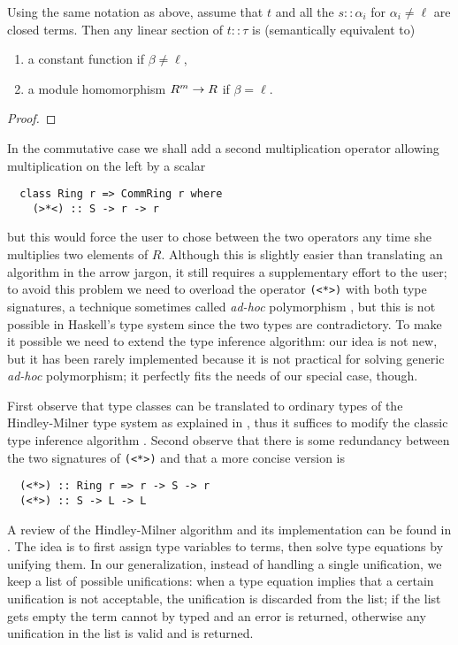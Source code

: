 \begin{proposition}
  \label{th:lininference}
  Using the same notation as above, assume that $t$ and all the
  $s::\alpha_i$ for $\alpha_i\ne\ell$ are closed terms. Then any
  linear section of $t::\tau$ is (semantically equivalent to)
  \begin{enumerate}
  \item a constant function if $\beta\ne\ell$,
  \item a module homomorphism $R^m\rightarrow R$ if $\beta=\ell$.
  \end{enumerate}
\end{proposition}
\begin{proof}
  \todo
\end{proof}

In the commutative case we shall add a second multiplication operator
allowing multiplication on the left by a scalar
\begin{lstlisting}
  class Ring r => CommRing r where
    (>*<) :: S -> r -> r 
\end{lstlisting}
but this would force the user to chose between the two operators any
time she multiplies two elements of $R$. Although this is slightly
easier than translating an algorithm in the arrow jargon, it still
requires a supplementary effort to the user; to avoid this problem we
need to overload the operator \lstinline{(<*>)} with both type
signatures, a technique sometimes called \emph{ad-hoc} polymorphism
\cite{Str00}, but this is not possible in Haskell's type system since
the two types are contradictory.  To make it possible we need to
extend the type inference algorithm: our idea is not new, but it has
been rarely implemented because it is not practical for solving
generic \emph{ad-hoc} polymorphism; it perfectly fits the needs of our
special case, though.

First observe that type classes can be translated to ordinary types of
the Hindley-Milner type system as explained in \cite[$\S 4$]{WaBl89},
thus it suffices to modify the classic type inference algorithm
\cite{DM82,Cardelli}. Second observe that there is some redundancy
between the two signatures of \lstinline{(<*>)} and that a more
concise version is
\begin{lstlisting}
  (<*>) :: Ring r => r -> S -> r
  (<*>) :: S -> L -> L
\end{lstlisting}

A review of the Hindley-Milner algorithm and its implementation can be
found in \cite{Cardelli}. The idea is to first assign type variables
to terms, then solve type equations by unifying them.  In our
generalization, instead of handling a single unification, we keep a
list of possible unifications: when a type equation implies that a
certain unification is not acceptable, the unification is discarded
from the list; if the list gets empty the term cannot by typed and an
error is returned, otherwise any unification in the list is valid and
is returned.

